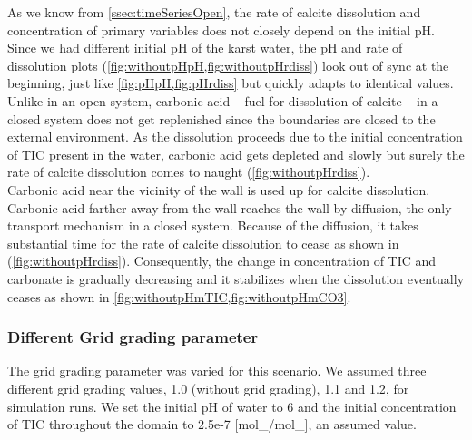 As we know from \ref{ssec:timeSeriesOpen}, the rate of calcite dissolution and concentration of primary variables 
does not closely depend on the initial pH. Since we had different initial pH of the karst water, the pH and rate of 
dissolution plots (\cref{fig:withoutpHpH,fig:withoutpHrdiss}) look out of sync at the beginning, just 
like \cref{fig:pHpH,fig:pHrdiss} but quickly adapts to identical values. 
Unlike in an open system, carbonic acid -- fuel for dissolution of calcite -- in a closed system does not get replenished since 
the boundaries are closed to the external environment. As the dissolution proceeds due to the initial concentration 
of TIC present in the water, carbonic acid gets depleted and slowly but surely the rate of calcite dissolution comes to naught (\cref{fig:withoutpHrdiss}). \\

Carbonic acid near the vicinity of the wall is used up for calcite dissolution. Carbonic acid farther away from the wall reaches the wall by 
diffusion, the only transport mechanism in a closed system. Because of the diffusion, it takes substantial time for 
the rate of calcite dissolution to cease as shown in (\cref{fig:withoutpHrdiss}). Consequently, the change in concentration of TIC and carbonate 
is gradually decreasing and it stabilizes when the dissolution eventually ceases as shown in \cref{fig:withoutpHmTIC,fig:withoutpHmCO3}.


\subsubsection*{Different Grid grading parameter} \label{ssec:diffGridnoflow}
The grid grading parameter was varied for this scenario. We assumed three different grid grading values, 
1.0 (without grid grading), 1.1 and 1.2, for simulation runs. We set the initial pH of water to 6 and 
the initial concentration of TIC throughout the domain to 2.5e-7 [mol\_/mol\_], 
an assumed value. \\


